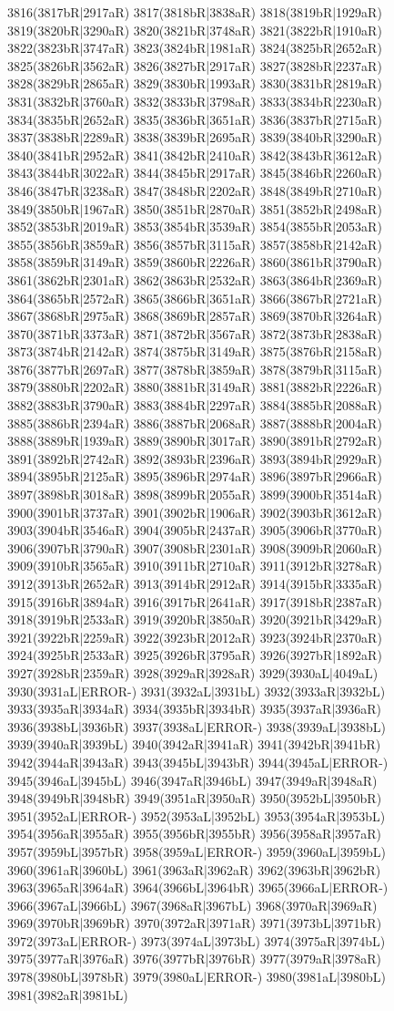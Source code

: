 3816(3817bR|2917aR) 3817(3818bR|3838aR) 3818(3819bR|1929aR) 3819(3820bR|3290aR) 3820(3821bR|3748aR) 3821(3822bR|1910aR) 3822(3823bR|3747aR) 3823(3824bR|1981aR) 3824(3825bR|2652aR) 3825(3826bR|3562aR) 3826(3827bR|2917aR) 3827(3828bR|2237aR) 3828(3829bR|2865aR) 3829(3830bR|1993aR) 3830(3831bR|2819aR) 3831(3832bR|3760aR) 3832(3833bR|3798aR) 3833(3834bR|2230aR) 3834(3835bR|2652aR) 3835(3836bR|3651aR) 3836(3837bR|2715aR) 3837(3838bR|2289aR) 3838(3839bR|2695aR) 3839(3840bR|3290aR) 3840(3841bR|2952aR) 3841(3842bR|2410aR) 3842(3843bR|3612aR) 3843(3844bR|3022aR) 3844(3845bR|2917aR) 3845(3846bR|2260aR) 3846(3847bR|3238aR) 3847(3848bR|2202aR) 3848(3849bR|2710aR) 3849(3850bR|1967aR) 3850(3851bR|2870aR) 3851(3852bR|2498aR) 3852(3853bR|2019aR) 3853(3854bR|3539aR) 3854(3855bR|2053aR) 3855(3856bR|3859aR) 3856(3857bR|3115aR) 3857(3858bR|2142aR) 3858(3859bR|3149aR) 3859(3860bR|2226aR) 3860(3861bR|3790aR) 3861(3862bR|2301aR) 3862(3863bR|2532aR) 3863(3864bR|2369aR) 3864(3865bR|2572aR) 3865(3866bR|3651aR) 3866(3867bR|2721aR) 3867(3868bR|2975aR) 3868(3869bR|2857aR) 3869(3870bR|3264aR) 3870(3871bR|3373aR) 3871(3872bR|3567aR) 3872(3873bR|2838aR) 3873(3874bR|2142aR) 3874(3875bR|3149aR) 3875(3876bR|2158aR) 3876(3877bR|2697aR) 3877(3878bR|3859aR) 3878(3879bR|3115aR) 3879(3880bR|2202aR) 3880(3881bR|3149aR) 3881(3882bR|2226aR) 3882(3883bR|3790aR) 3883(3884bR|2297aR) 3884(3885bR|2088aR) 3885(3886bR|2394aR) 3886(3887bR|2068aR) 3887(3888bR|2004aR) 3888(3889bR|1939aR) 3889(3890bR|3017aR) 3890(3891bR|2792aR) 3891(3892bR|2742aR) 3892(3893bR|2396aR) 3893(3894bR|2929aR) 3894(3895bR|2125aR) 3895(3896bR|2974aR) 3896(3897bR|2966aR) 3897(3898bR|3018aR) 3898(3899bR|2055aR) 3899(3900bR|3514aR) 3900(3901bR|3737aR) 3901(3902bR|1906aR) 3902(3903bR|3612aR) 3903(3904bR|3546aR) 3904(3905bR|2437aR) 3905(3906bR|3770aR) 3906(3907bR|3790aR) 3907(3908bR|2301aR) 3908(3909bR|2060aR) 3909(3910bR|3565aR) 3910(3911bR|2710aR) 3911(3912bR|3278aR) 3912(3913bR|2652aR) 3913(3914bR|2912aR) 3914(3915bR|3335aR) 3915(3916bR|3894aR) 3916(3917bR|2641aR) 3917(3918bR|2387aR) 3918(3919bR|2533aR) 3919(3920bR|3850aR) 3920(3921bR|3429aR) 3921(3922bR|2259aR) 3922(3923bR|2012aR) 3923(3924bR|2370aR) 3924(3925bR|2533aR) 3925(3926bR|3795aR) 3926(3927bR|1892aR) 3927(3928bR|2359aR) 3928(3929aR|3928aR) 3929(3930aL|4049aL) 3930(3931aL|ERROR-) 3931(3932aL|3931bL) 3932(3933aR|3932bL) 3933(3935aR|3934aR) 3934(3935bR|3934bR) 3935(3937aR|3936aR) 3936(3938bL|3936bR) 3937(3938aL|ERROR-) 3938(3939aL|3938bL) 3939(3940aR|3939bL) 3940(3942aR|3941aR) 3941(3942bR|3941bR) 3942(3944aR|3943aR) 3943(3945bL|3943bR) 3944(3945aL|ERROR-) 3945(3946aL|3945bL) 3946(3947aR|3946bL) 3947(3949aR|3948aR) 3948(3949bR|3948bR) 3949(3951aR|3950aR) 3950(3952bL|3950bR) 3951(3952aL|ERROR-) 3952(3953aL|3952bL) 3953(3954aR|3953bL) 3954(3956aR|3955aR) 3955(3956bR|3955bR) 3956(3958aR|3957aR) 3957(3959bL|3957bR) 3958(3959aL|ERROR-) 3959(3960aL|3959bL) 3960(3961aR|3960bL) 3961(3963aR|3962aR) 3962(3963bR|3962bR) 3963(3965aR|3964aR) 3964(3966bL|3964bR) 3965(3966aL|ERROR-) 3966(3967aL|3966bL) 3967(3968aR|3967bL) 3968(3970aR|3969aR) 3969(3970bR|3969bR) 3970(3972aR|3971aR) 3971(3973bL|3971bR) 3972(3973aL|ERROR-) 3973(3974aL|3973bL) 3974(3975aR|3974bL) 3975(3977aR|3976aR) 3976(3977bR|3976bR) 3977(3979aR|3978aR) 3978(3980bL|3978bR) 3979(3980aL|ERROR-) 3980(3981aL|3980bL) 3981(3982aR|3981bL) 